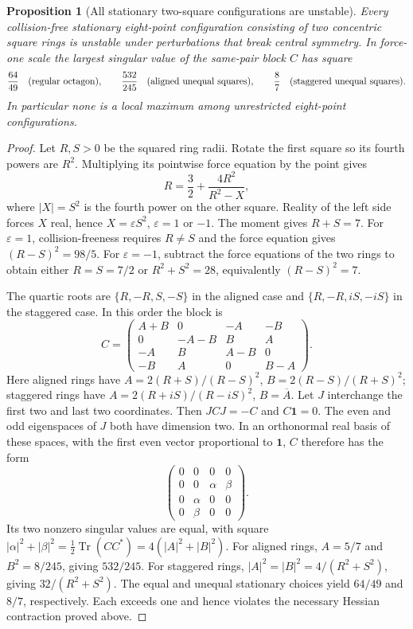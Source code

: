 \documentclass[11pt]{article}
\newtheorem{proposition}[theorem]{Proposition}
\theoremstyle{remark}
\numberwithin{equation}{section}
\begin{document}
\begin{proposition}[All stationary two-square configurations are unstable]
\label{prop:n8-two-square-unstable}
Every collision-free stationary eight-point configuration consisting
of two concentric square rings is unstable under perturbations that
break central symmetry. In force-one scale the largest singular value
of the same-pair block $C$ has square
\[
 \frac{64}{49}\quad\hbox{(regular octagon)},\qquad
 \frac{532}{245}\quad\hbox{(aligned unequal squares)},\qquad
 \frac87\quad\hbox{(staggered unequal squares)}.
\]
In particular none is a local maximum among unrestricted eight-point
configurations.
\end{proposition}
\begin{proof}
Let $R,S>0$ be the squared ring radii. Rotate the first square so its
fourth powers are $R^2$. Multiplying its pointwise force equation by
the point gives
\[
 R=\frac32+\frac{4R^2}{R^2-X},
\]
where $|X|=S^2$ is the fourth power on the other square. Reality of
the left side forces $X$ real, hence $X=\varepsilon S^2$,
$\varepsilon=1$ or $-1$. The moment gives $R+S=7$.
For $\varepsilon=1$, collision-freeness requires $R\ne S$ and the
force equation gives $(R-S)^2=98/5$. For $\varepsilon=-1$, subtract
the force equations of the two rings to obtain either $R=S=7/2$ or
$R^2+S^2=28$, equivalently $(R-S)^2=7$.

The quartic roots are $\{R,-R,S,-S\}$ in the aligned case and
$\{R,-R,iS,-iS\}$ in the staggered case. In this order the block is
\[
 C=\begin{pmatrix}
 A+B&0&-A&-B\\
 0&-A-B&B&A\\
 -A&B&A-B&0\\
 -B&A&0&B-A
 \end{pmatrix}.
\]
Here aligned rings have
$A=2(R+S)/(R-S)^2$, $B=2(R-S)/(R+S)^2$; staggered rings have
$A=2(R+iS)/(R-iS)^2$, $B=\overline A$.
Let $J$ interchange the first two and last two coordinates. Then
$JCJ=-C$ and $C\mathbf1=0$. The even and odd eigenspaces of $J$
both have dimension two. In an orthonormal real basis of these
spaces, with the first even vector proportional to $\mathbf1$,
$C$ therefore has the form
\[
 \begin{pmatrix}
 0&0&0&0\\0&0&\alpha&\beta\\
 0&\alpha&0&0\\0&\beta&0&0
 \end{pmatrix}.
\]
Its two nonzero singular values are equal, with square
$|\alpha|^2+|\beta|^2=\tfrac12\operatorname{Tr}(CC^*)
=4(|A|^2+|B|^2)$.
For aligned rings, $A=5/7$ and $B^2=8/245$, giving $532/245$.
For staggered rings, $|A|^2=|B|^2=4/(R^2+S^2)$, giving
$32/(R^2+S^2)$. The equal and unequal stationary choices yield
$64/49$ and $8/7$, respectively. Each exceeds one and hence violates
the necessary Hessian contraction proved above.
\end{proof}
\end{document}
